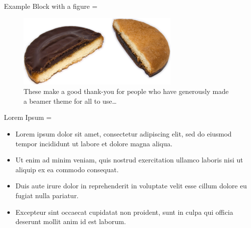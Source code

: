 \documentclass[final,hyperref={pdfpagelabels=false}]{beamer}
\newcommand{\correctitemizeindent}{\setlength{\leftmargini}{2.5em}}
\begin{document}
\begin{frame}
\begin{columns}[T]
\begin{column}{.32\textwidth}
\begin{minipage}[t]{.95\textwidth}
{			\begin{rightColumnBlock}{Example Block with a figure}
				\correctitemizeindent
				\rightskip=\leftskip
				\begin{center}
				\begin{minipage}{0.95\textwidth}
				\begin{figure} \label{fig:memory-transform}
					\begin{center}
						\includegraphics[width=\textwidth]{graphics/jaffa_cake}
					\end{center}
				\caption{These make a good thank-you for people who have generously made a beamer theme for all to use\dots}
				\end{figure}
				\end{minipage}
				\end{center}				
			\end{rightColumnBlock}
			
			\vfill
			
			\begin{rightColumnBlock}{Lorem Ipsum}
			\rightskip=\leftskip
			{\correctitemizeindent
			\begin{itemize}
				\item Lorem ipsum dolor sit amet, consectetur adipiscing elit, sed do eiusmod tempor incididunt ut labore et dolore magna aliqua.
				\item Ut enim ad minim veniam, quis nostrud exercitation ullamco laboris nisi ut aliquip ex ea commodo consequat.
				\item Duis aute irure dolor in reprehenderit in voluptate velit esse cillum dolore eu fugiat nulla pariatur.
				\item Excepteur sint occaecat cupidatat non proident, sunt in culpa qui officia deserunt mollit anim id est laborum.
			\end{itemize}
			}
			\end{rightColumnBlock}
			
}
\end{minipage}
\end{column}
\end{columns}
\end{frame}
\end{document}
